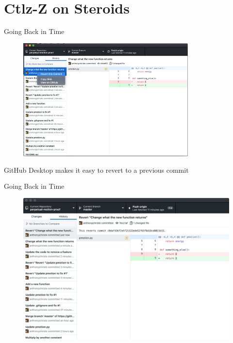 \documentclass{beamer}
\begin{document}
    \section{Ctlz-Z on Steroids}\label{sec:ctlz-z-on-steroids}
    \begin{frame}{Going Back in Time}
        \begin{figure}
            \centering
            \includegraphics[width=0.8\textwidth]{figures/revert_1.png}
        \end{figure}
        \centering
        GitHub Desktop makes it easy to revert to a previous commit
    \end{frame}

    \begin{frame}{Going Back in Time}
        \begin{figure}
            \centering
            \includegraphics[width=\textwidth]{figures/revert_2.png}
        \end{figure}
        \centering
    \end{frame}
\end{document}
